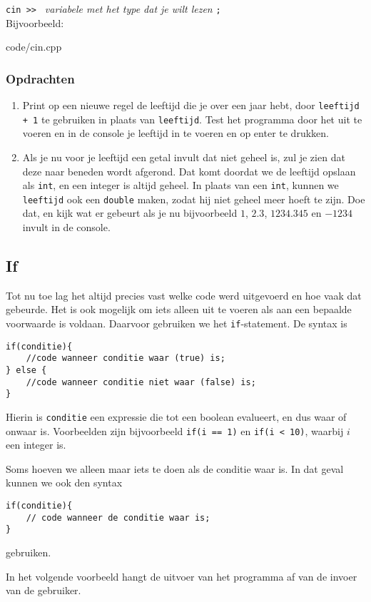 \documentclass[12pt,a4paper]{article}
\newcommand{\code}{}
\newcommand{\icode}{\lstinline}
\begin{document}
\icode{cin >> } \emph{variabele met het type dat je wilt lezen} \icode{;}\\

Bijvoorbeeld:

\code{code/cin.cpp}
\subsubsection{Opdrachten}
\begin{enumerate}
	\item Print op een nieuwe regel de leeftijd die je over een jaar hebt, door \icode{leeftijd + 1} te gebruiken in plaats van \icode{leeftijd}.
		Test het programma door het uit te voeren en in de console je leeftijd in te voeren en op enter te drukken.
	\item
		Als je nu voor je leeftijd een getal invult dat niet geheel is, zul je zien dat deze naar beneden wordt afgerond. Dat komt doordat we de leeftijd opslaan als \icode{int}, en een integer is altijd geheel.
		In plaats van een \icode{int}, kunnen we \icode{leeftijd} ook een \icode{double} maken, zodat hij niet geheel meer hoeft te zijn. Doe dat, en kijk wat er gebeurt als je nu bijvoorbeeld $1$, $2.3$, $1234.345$ en $-1234$ invult in de console.
\end{enumerate}


\subsection{If}
Tot nu toe lag het altijd precies vast welke code werd uitgevoerd en hoe vaak dat gebeurde. Het is ook mogelijk om iets alleen uit te voeren als aan een bepaalde voorwaarde is voldaan. Daarvoor gebruiken we het \icode{if}-statement. De syntax is
\begin{lstlisting}
if(conditie){
	//code wanneer conditie waar (true) is;
} else {
	//code wanneer conditie niet waar (false) is;
}
\end{lstlisting}
Hierin is \icode{conditie} een expressie die tot een boolean evalueert, en dus waar of onwaar is. Voorbeelden zijn bijvoorbeeld \icode{if(i == 1)} en \icode{if(i < 10)}, waarbij $i$ een integer is. 

Soms hoeven we alleen maar iets te doen als de conditie waar is. In dat geval kunnen we ook den syntax
\begin{lstlisting}
if(conditie){
	// code wanneer de conditie waar is;
}
\end{lstlisting}
gebruiken.

In het volgende voorbeeld hangt de uitvoer van het programma af van de invoer van de gebruiker.
\end{document}
